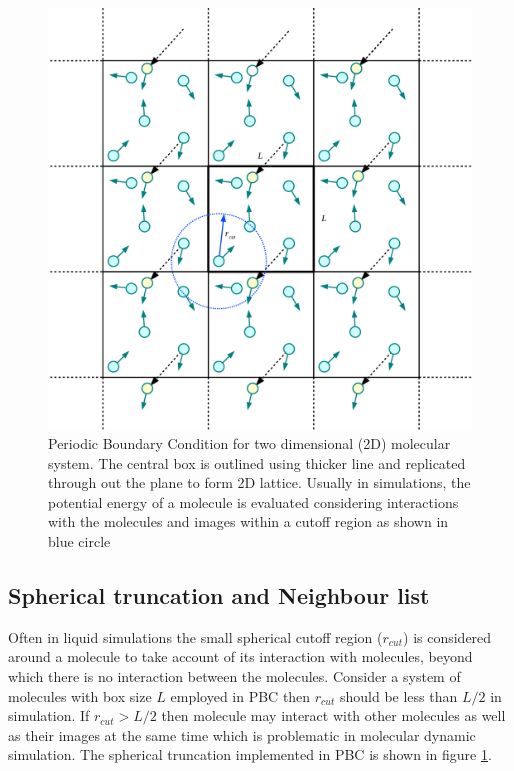   
\begin{figure}[tpb]
  \begin{center}
    \centerline{\includegraphics[scale=0.8]{PBC.pdf}}
    \caption{Periodic Boundary Condition for two dimensional (2D) molecular system. The central 	box is outlined using thicker line and replicated through out the plane to form 2D lattice. Usually in simulations, the potential energy of a molecule is evaluated considering interactions with the molecules and images within a cutoff region as shown in blue circle}
    \label{fig:PBC}
  \end{center}
\end{figure}

\subsection{Spherical truncation and Neighbour list }
Often in liquid simulations the small spherical cutoff region ($r_{cut}$) is considered around a molecule to take account of its interaction with molecules, beyond which there is no interaction between the molecules. Consider a system of molecules with box size $L$ employed in PBC then $r_{cut}$ should be less than $L/2$ in simulation. If $r_{cut} > L/2$ then molecule may interact with other molecules as well as their images at the same time which is problematic in molecular dynamic simulation. The spherical truncation implemented in PBC is shown in figure \ref{fig:PBC}. 


